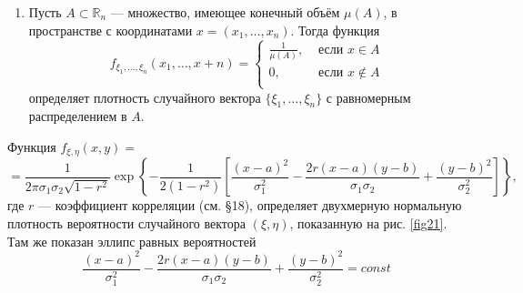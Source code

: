 \begin{example}
\label{ex:15.8}
	\begin{enumerate}
		\item Пусть $A \subset \mathbb{R}_n$ — множество, имеющее конечный
			объём $\mu(A)$, в пространстве с координатами $x = (x_1,\dots, x_n)$. Тогда функция
			\begin{equation*}
				f_{\xi_1,\dots,\xi_n}(x_1,\dots,x+n)=
				\begin{cases}
					\frac{1}{\mu(A)}, &\text{ если } x\in A\\
					0, &\text{ если } x\notin A\\
				\end{cases}
			\end{equation*}
			определяет плотность случайного вектора $\{\xi_1,\dots,\xi_n\}$ с равномерным распределением в $A$.
	\end{enumerate}
		\item Функция $f_{\xi,\eta}(x,y)=$
		\begin{equation*}
			=\frac{1}{2\pi\sigma_1\sigma_2\sqrt{1-r^2}}\exp
			\left\{
				-\frac{1}{2(1-r^2)}
			\left[
				\frac{(x-a)^2}{\sigma_1^2}-\frac{2r(x-a)(y-b)}{\sigma_1\sigma_2}+\frac{(y-b)^2}{\sigma_2^2} 
			\right] 
			\right\},
		\end{equation*}
		где $r$ — коэффициент корреляции (см. \S18), определяет двухмерную нормальную плотность вероятности случайного вектора $(\xi, \eta)$, показанную на рис. \ref{fig21}. Там же показан эллипс равных вероятностей
		\begin{equation*}
			\frac{(x-a)^2}{\sigma_1^2}-\frac{2r(x-a)(y-b)}{\sigma_1\sigma_2}+\frac{(y-b)^2}{\sigma_2^2}=const
		\end{equation*}
\begin{figure}[H]
	\centering

\end{figure}
\end{example}
